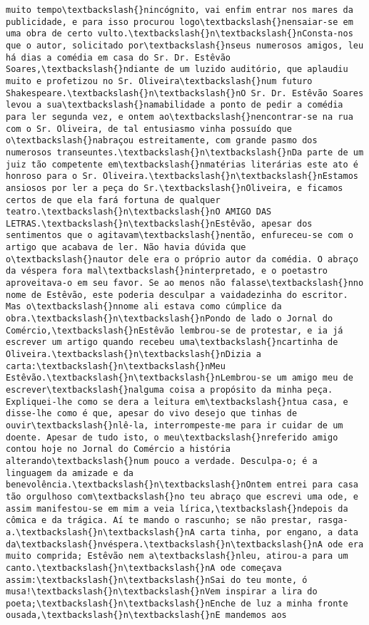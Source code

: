 \documentclass[11pt]{article}
\begin{document}
\begin{Verbatim}[commandchars=\\\{\}]
muito tempo\textbackslash{}nincógnito, vai enfim entrar nos mares da publicidade, e para isso procurou logo\textbackslash{}nensaiar-se em uma obra de certo vulto.\textbackslash{}n\textbackslash{}nConsta-nos que o autor, solicitado por\textbackslash{}nseus numerosos amigos, leu há dias a comédia em casa do Sr. Dr. Estêvão Soares,\textbackslash{}ndiante de um luzido auditório, que aplaudiu muito e profetizou no Sr. Oliveira\textbackslash{}num futuro Shakespeare.\textbackslash{}n\textbackslash{}nO Sr. Dr. Estêvão Soares levou a sua\textbackslash{}namabilidade a ponto de pedir a comédia para ler segunda vez, e ontem ao\textbackslash{}nencontrar-se na rua com o Sr. Oliveira, de tal entusiasmo vinha possuído que o\textbackslash{}nabraçou estreitamente, com grande pasmo dos numerosos transeuntes.\textbackslash{}n\textbackslash{}nDa parte de um juiz tão competente em\textbackslash{}nmatérias literárias este ato é honroso para o Sr. Oliveira.\textbackslash{}n\textbackslash{}nEstamos ansiosos por ler a peça do Sr.\textbackslash{}nOliveira, e ficamos certos de que ela fará fortuna de qualquer teatro.\textbackslash{}n\textbackslash{}nO AMIGO DAS LETRAS.\textbackslash{}n\textbackslash{}nEstêvão, apesar dos sentimentos que o agitavam\textbackslash{}nentão, enfureceu-se com o artigo que acabava de ler. Não havia dúvida que o\textbackslash{}nautor dele era o próprio autor da comédia. O abraço da véspera fora mal\textbackslash{}ninterpretado, e o poetastro aproveitava-o em seu favor. Se ao menos não falasse\textbackslash{}nno nome de Estêvão, este poderia desculpar a vaidadezinha do escritor. Mas o\textbackslash{}nnome ali estava como cúmplice da obra.\textbackslash{}n\textbackslash{}nPondo de lado o Jornal do Comércio,\textbackslash{}nEstêvão lembrou-se de protestar, e ia já escrever um artigo quando recebeu uma\textbackslash{}ncartinha de Oliveira.\textbackslash{}n\textbackslash{}nDizia a carta:\textbackslash{}n\textbackslash{}nMeu Estêvão.\textbackslash{}n\textbackslash{}nLembrou-se um amigo meu de escrever\textbackslash{}nalguma coisa a propósito da minha peça. Expliquei-lhe como se dera a leitura em\textbackslash{}ntua casa, e disse-lhe como é que, apesar do vivo desejo que tinhas de ouvir\textbackslash{}nlê-la, interrompeste-me para ir cuidar de um doente. Apesar de tudo isto, o meu\textbackslash{}nreferido amigo contou hoje no Jornal do Comércio a história alterando\textbackslash{}num pouco a verdade. Desculpa-o; é a linguagem da amizade e da benevolência.\textbackslash{}n\textbackslash{}nOntem entrei para casa tão orgulhoso com\textbackslash{}no teu abraço que escrevi uma ode, e assim manifestou-se em mim a veia lírica,\textbackslash{}ndepois da cômica e da trágica. Aí te mando o rascunho; se não prestar, rasga-a.\textbackslash{}n\textbackslash{}nA carta tinha, por engano, a data da\textbackslash{}nvéspera.\textbackslash{}n\textbackslash{}nA ode era muito comprida; Estêvão nem a\textbackslash{}nleu, atirou-a para um canto.\textbackslash{}n\textbackslash{}nA ode começava assim:\textbackslash{}n\textbackslash{}nSai do teu monte, ó musa!\textbackslash{}n\textbackslash{}nVem inspirar a lira do poeta;\textbackslash{}n\textbackslash{}nEnche de luz a minha fronte ousada,\textbackslash{}n\textbackslash{}nE mandemos aos 
\end{Verbatim}
\end{document}

